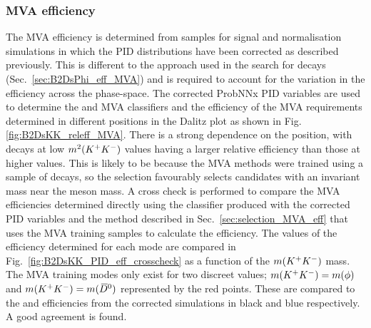 \subsubsection{MVA efficiency}

The MVA efficiency is determined from samples for signal and normalisation simulations in which the PID distributions have been corrected as described previously. This is different to the approach used in the search for \decay{\Bp}{\Dsp\phiz} decays (Sec.~\ref{sec:B2DsPhi_eff_MVA}) and is required to account for the variation in the efficiency across the phase-space. The corrected ProbNNx PID variables are used to determine the \Dsp and \phiz MVA classifiers and the efficiency of the MVA requirements determined in different positions in the Dalitz plot as shown in Fig.\ref{fig:B2DsKK_releff_MVA}. There is a strong dependence on the position, with decays at low $m^{2}({{K}^+}{{K}^-})$ values having a larger relative efficiency than those at higher values. This is likely to be because the MVA methods were trained using a sample of \decay{\phiz}{\Kp\Km} decays, so the selection favourably selects candidates with an invariant mass near the \phiz meson mass. A cross check is performed to compare the MVA efficiencies determined directly using the classifier produced with the corrected PID variables and the method described in Sec.~\ref{sec:selection_MVA_eff} that uses the MVA training samples to calculate the efficiency. The values of the efficiency determined for each mode are compared in Fig.~\ref{fig:B2DsKK_PID_eff_crosscheck} as a function of the $m({{K}^+}{{K}^-})$ mass. The MVA training modes only exist for two discreet values; $m({{K}^+}{{K}^-})=m(\phi)$ and $m({{K}^+}{{K}^-})=m({{\kern 0.2em\overline{\kern -0.2em D}{}}{}^0})$ represented by the red points. These are compared to the \decay{\Bp}{\Dsp\Kp\Km} and \decay{\Bp}{\Ds\Dzb} efficiencies from the corrected simulations in black and blue respectively. A good agreement is found.


